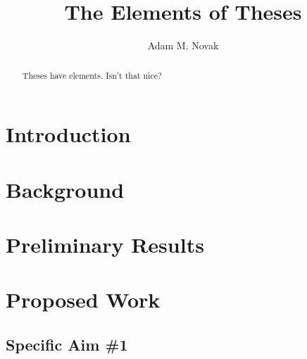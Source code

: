\documentclass[11pt,proposal]{ucthesis}
\begin{document}

\title{The Elements of Theses}
\author{Adam M. Novak}
\deanlinethree{}

\begin{frontmatter}

\maketitle
\copyrightpage

\tableofcontents
\listoffigures
\listoftables

\begin{abstract}
Theses have elements.  Isn't that nice?

\end{abstract}

\begin{acknowledgements}

\end{acknowledgements}

\end{frontmatter}

\chapter{Introduction}

\chapter{Background}

\chapter{Preliminary Results}

\chapter{Proposed Work}

\section{Specific Aim \#1}
\end{document}
